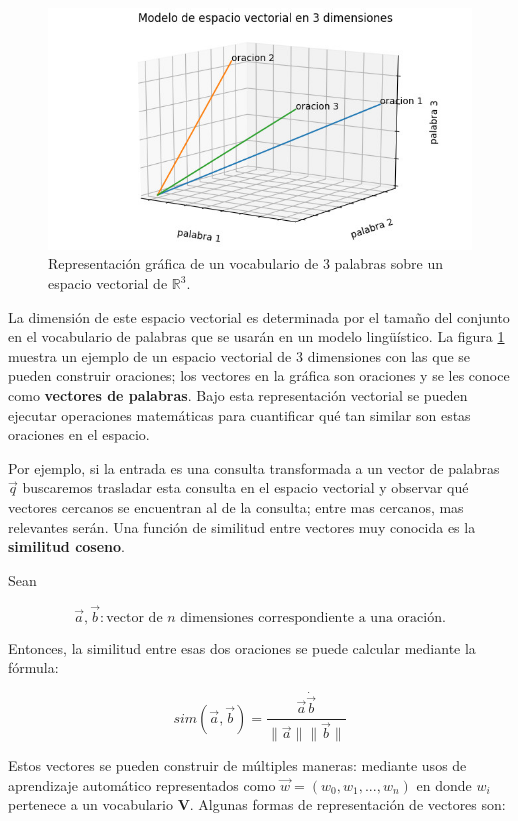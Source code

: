 \begin{figure}[ht]
    \centering
    \includegraphics[scale=0.6]{images/2/vector-space-model}
    \caption{Representación gráfica de un vocabulario de 3 palabras sobre un espacio vectorial de $\mathbb{R}^3$.}
    \label{fig:espacio-vectorial}
\end{figure}

La dimensión de este espacio vectorial es determinada por el tamaño del conjunto en el vocabulario de palabras que se usarán en un modelo lingüístico. La figura \ref{fig:espacio-vectorial} muestra un ejemplo de un espacio vectorial de 3 dimensiones con las que se pueden construir oraciones; los vectores en la gráfica son oraciones y se les conoce como \textbf{vectores de palabras}. Bajo esta representación vectorial se pueden ejecutar operaciones matemáticas para cuantificar qué tan similar son estas oraciones en el espacio.

Por ejemplo, si la entrada es una consulta transformada a un vector de palabras $\vec{q}$ buscaremos trasladar esta consulta en el espacio vectorial y observar qué vectores cercanos se encuentran al de la consulta; entre mas cercanos, mas relevantes serán. Una función de similitud entre vectores muy conocida es la \textbf{similitud coseno}. 

Sean 

$$\vec{a},\vec{b} : \text{vector de } n \text{ dimensiones correspondiente a una oración.}$$

Entonces, la similitud entre esas dos oraciones se puede calcular mediante la fórmula:

$$
sim(\vec{a}, \vec{b}) = \frac{\vec{a} \dot \vec{b}}{\| \vec{a} \| \| \vec{b} \|}
$$

Estos vectores se pueden construir de múltiples maneras: mediante usos de aprendizaje automático representados como $\vec{w} = (w_0, w_1, ..., w_n)$ en donde $w_i$ pertenece a un vocabulario $\mathbf{V}$. Algunas formas de representación de vectores son:

